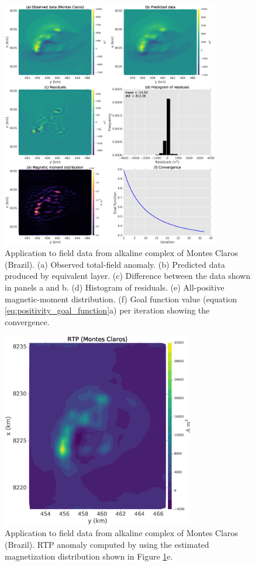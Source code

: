 \begin{figure}
	\centering
	\includegraphics[width=0.85\textwidth]{Fig/field_data_montes_claros/figure5.eps}
	\caption{Application to field data from alkaline complex of Montes Claros (Brazil). (a) Observed total-field anomaly. (b) Predicted data produced by equivalent layer. (c) Difference between the data shown in panels a and b. (d) Histogram of residuals. (e) All-positive magnetic-moment distribution. (f) Goal function value (equation \ref{eq:positivity_goal_function}a) per iteration showing the convergence.}
	\label{fig:mc_data_application}
\end{figure}

\begin{figure}
	\centering
	\includegraphics[width=0.75\textwidth]{Fig/field_data_montes_claros/figure6.eps}
	\caption{Application to field data from alkaline complex of Montes Claros (Brazil). RTP anomaly computed by using the estimated magnetization distribution shown in Figure \ref{fig:mc_data_application}e.}
	\label{fig:rtp_mc_data}
\end{figure}

